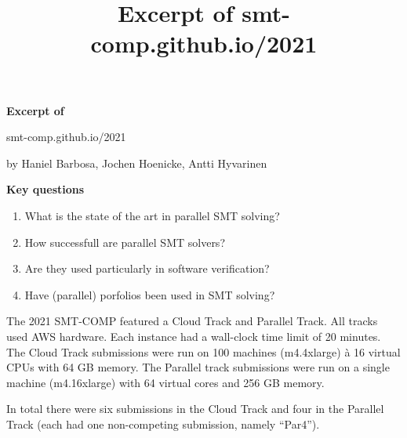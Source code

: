 \documentclass{scrartcl}
\title{Excerpt of smt-comp.github.io/2021}
\begin{document}
\begin{center}
    \Large{\textbf{Excerpt of}}

    \LARGE{smt-comp.github.io/2021}

    \large{by Haniel Barbosa, Jochen Hoenicke, Antti Hyvarinen}
\end{center}

\vspace{1cm}

\begin{addmargin}[0.2\linewidth]{0.2\linewidth}
    \begin{center}
        \textbf{Key questions}
    \end{center}
    \begin{enumerate}[i]
        \item What is the state of the art in parallel SMT solving?
        \item How successfull are parallel SMT solvers?
        \item Are they used particularly in software verification?
        \item Have (parallel) porfolios been used in SMT solving?
    \end{enumerate}
\end{addmargin}

\vspace{1cm}

The 2021 SMT-COMP featured a Cloud Track and Parallel Track.
All tracks used AWS hardware.
Each instance had a wall-clock time limit of 20 minutes.
The Cloud Track submissions were run on 100 machines (m4.4xlarge)
à 16 virtual CPUs with 64 GB memory.
The Parallel track submissions were run on a single machine (m4.16xlarge)
with 64 virtual cores and 256 GB memory.

In total there were six submissions in the Cloud Track and four in the Parallel Track
(each had one non-competing submission, namely \enquote{Par4}).
\end{document}
